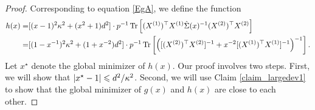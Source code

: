 \begin{proof}
Corresponding to equation \eqref{EgA}, we define the function
\begin{align*}
	h(x)  =& [(x-1)^2\kappa^2 + (x^2+1)d^2] \cdot p^{-1} \operatorname{Tr}\left[ (X^{(1)})^\top X^{(1)} \hat\Sigma(x)^{-1}(X^{(2)})^\top X^{(2)}\right] \\
				=& [(1-x^{-1})^2\kappa^2 + (1+x^{-2})d^2] \cdot p^{-1} \operatorname{Tr}\left[\left([(X^{(2)})^\top X^{(2)}]^{-1} + x^{-2} [(X^{(1)})^\top X^{(1)}]^{-1}\right)^{-1}\right].
\end{align*}
Let $x^{\star}$ denote the global minimizer of $h(x)$.
Our proof involves two steps.
First, we will show that $\left\lvert x^{\star} - 1\right\rvert \leqslant d^2 / \kappa^2$.
Second, we will use Claim \ref{claim_largedev1} to show that the global minimizer of $g(x)$ and $h(x)$ are close to each other.


\end{proof}
